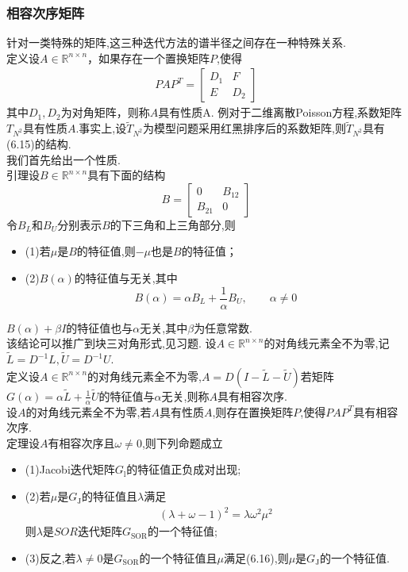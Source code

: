 \documentclass[12pt,a4paper]{article}
\begin{document}
\subsubsection{相容次序矩阵}
针对一类特殊的矩阵,这三种迭代方法的谱半径之间存在一种特殊关系.\\
{\color{blue}定义}设$A \in \mathbb{R}^{n \times n}$，如果存在一个置换矩阵$P$,使得
\begin{align}
P A P^{T}=\left[\begin{array}{cc}{D_{1}} & {F} \\ {E} & {D_{2}}\end{array}\right]\tag{6.15}
\end{align}
其中$D_{1}, D_{2}$为对角矩阵，则称$A$具有{\color{blue}性质A}.
{\color{blue}例}\quad 对于二维离散Poisson方程,系数矩阵$T_{N^{2}}$具有性质$A$.事实上,设$\tilde{T}_{N^{2}}$为模型问题采用红黑排序后的系数矩阵,则$\tilde{T}_{N^{2}}$具有({\color{blue}6.15})的结构.\\
我们首先给出一个性质.\\
{\color{blue}引理}\quad 设$B \in \mathbb{R}^{n \times n}$具有下面的结构
$$
B=\left[\begin{array}{cc}{0} & {B_{12}} \\ {B_{21}} & {0}\end{array}\right]
$$
令$B_L$和$B_U$分别表示$B$的下三角和上三角部分,则
\begin{itemize}
\item (1)若$\mu$是$B$的特征值,则$-\mu$也是$B$的特征值；
\item (2)$B(\alpha)$的特征值与无关,其中
$$
B(\alpha)=\alpha B_L+\frac{1}{\alpha}B_U,\qquad \alpha \ne 0
$$
\end{itemize}
$B(\alpha)+\beta I$的特征值也与$\alpha$无关,其中$\beta$为任意常数.\\
该结论可以推广到块三对角形式,见习题.
设$A \in \mathbb{R}^{n \times n}$的对角线元素全不为零,记$\tilde{L}=D^{-1} L, \tilde{U}=D^{-1} U$.\\
{\color{blue}定义}设$A \in \mathbb{R}^{n \times n}$的对角线元素全不为零,$A=D(I-\tilde{L}-\tilde{U})$若矩阵$G(\alpha)=\alpha \tilde{L}+\frac{1}{\alpha} \tilde{U}$的特征值与$\alpha$无关,则称$A$具有相容次序.\\
设$A$的对角线元素全不为零,若$A$具有性质$A$,则存在置换矩阵$P$,使得$P A P^{T}$具有相容次序.\\
{\color{blue}定理}\quad 设$A$有相容次序且$\omega \neq 0$,则下列命题成立
\begin{itemize}
\item (1)Jacobi迭代矩阵$G_{\mathrm{l}}$的特征值正负成对出现;
\item (2)若$\mu$是$G_{\mathrm{J}}$的特征值且$\lambda$满足
\begin{align}
	(\lambda+\omega-1)^{2}=\lambda \omega^{2} \mu^{2}\tag{6.16}
\end{align}
则$\lambda$是$SOR$迭代矩阵$G_{\mathrm{SOR}}$的一个特征值;
\item (3)反之,若$\lambda \neq 0$是$G_{\mathrm{SOR}}$的一个特征值且$\mu$满足(6.16),则$\mu$是$G_{\mathrm{J}}$的一个特征值.
\end{itemize}
\end{document}
